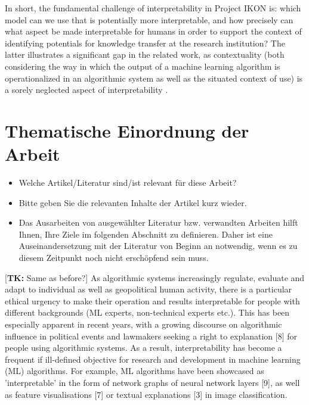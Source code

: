 \documentclass[pdftex,a4paper,12pt]{scrartcl}
\newcommand{\tk}[1]{\textcolor{tim}{[\textbf{TK:} #1]}}
\begin{document}
In short, the fundamental challenge of interpretability in Project IKON is: which model can we use that is potentially more interpretable, and how precisely can what aspect be made interpretable for humans in order to support the context of identifying potentials for knowledge transfer at the research institution? The latter illustrates a significant gap in the related work, as contextuality (both considering the way in which the output of a machine learning algorithm is operationalized in an algorithmic system as well as the situated context of use) is a sorely neglected aspect of interpretability \cite{millerExplanationArtificialIntelligence2017}.

\section{Thematische Einordnung der Arbeit}
\begin{itemize}
	\item Welche Artikel/Literatur sind/ist relevant für diese Arbeit? 
	\item Bitte geben Sie die relevanten Inhalte der Artikel kurz wieder.
	\item Das Ausarbeiten von ausgewählter Literatur bzw. verwandten Arbeiten hilft Ihnen, Ihre Ziele im folgenden Abschnitt zu definieren. Daher ist eine Auseinandersetzung mit der Literatur von Beginn an notwendig, wenn es zu diesem Zeitpunkt noch nicht erschöpfend sein muss.
\end{itemize}

\tk{Same as before?}
As algorithmic systems increasingly regulate, evaluate and adapt to individual as well as geopolitical human activity, there is a particular ethical urgency to make their operation and results interpretable for people with different backgrounds (ML experts, non-technical experts etc.). This has been especially apparent in recent years, with a growing discourse on algorithmic influence in political events and lawmakers seeking a right to explanation [8] for people using algorithmic systems. As a result, interpretability has become a frequent if ill-defined \cite{liptonMythosModelInterpretability2016} objective for research and development in machine learning (ML) algorithms. For example, ML algorithms have been showcased as 'interpretable' in the form of network graphs of neural network layers [9], as well as feature visualisations [7] or textual explanations [3] in image classification.
\end{document}
